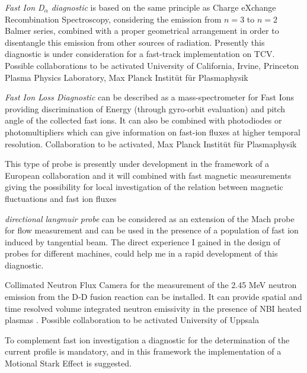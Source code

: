 \documentclass[12pt,a4paper]{article}
\begin{document}
\begin{description}[labelindent=0pt, labelsep*=0.4em, leftmargin=!, itemsep=0.02ex]
\item[FIDA:] \emph{Fast Ion D$_{\alpha}$ diagnostic} is based on the
  same principle as Charge eXchange Recombination Spectroscopy,
  considering the emission from $n=3$ to $n=2$ Balmer series, combined
  with a proper geometrical arrangement in order to disentangle this
  emission from other sources of radiation. Presently this diagnostic
  is under consideration for a fast-track implementation on
  TCV. Possible collaborations to be activated University of
  California, Irvine, Princeton Plasma Physics Laboratory, Max Planck Instit{\"u}t f{\"u}r Plasmaphysik
\item[FILD:] \emph{Fast Ion Loss Diagnostic} can be described as a
  mass-spectrometer for Fast Ions providing discrimination of Energy
  (through gyro-orbit evaluation) and pitch angle of the collected
  fast ions. It can also be combined with photodiodes or
  photomultipliers which can give information on fast-ion fluxes at
  higher temporal resolution. Collaboration to be activated, Max
  Planck Instit{\"u}t f{\"u}r Plasmaphysik
\item[Ion Energy Analyzer probe:] This type of probe is presently
  under development in the framework of a European collaboration and
  it will combined with fast magnetic measurements giving the
  possibility for local investigation of the relation between magnetic
  fluctuations and fast ion fluxes
\item[DLP:] \emph{directional langmuir probe} can be considered as an
  extension of the Mach probe for flow measurement and can be used in
  the 
  presence of a population of fast ion induced by tangential
  beam. The direct experience I gained in the design of probes for different
  machines, could help me in a rapid development of this diagnostic. 
\item[Neutron Camera:] Collimated Neutron Flux Camera for the
  measurement of the 2.45 MeV neutron emission from the D-D fusion
  reaction can be installed. It can provide spatial and time
  resolved volume integrated neutron emissivity in the presence of NBI
  heated plasmas \cite{Cecconello:2014hw}. Possible collaboration to be activated
  University of Uppsala
\end{description}
To complement fast ion investigation a diagnostic for the
determination of the current profile is mandatory, and in this
framework the implementation of a Motional Stark Effect is suggested.
\end{document}
